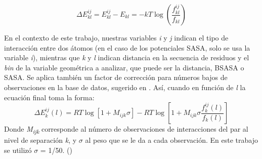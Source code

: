 \begin{equation}
\Delta E^{ij}_{kl} = E^{ij}_{kl} - E_{kl} = -kT\log \left( \frac{f^{ij}_{kl}}{f_{kl}} \right)
\end{equation}
\par
En el contexto de este trabajo, nuestras variables \textit{i} y \textit{j} indican el tipo de interacción entre dos átomos (en el caso de los potenciales SASA, solo se usa la variable \textit{i}), mientras que \textit{k} y \textit{l} indican distancia en la secuencia de residuos y el \textit{bin} de la variable geométrica a analizar, que puede ser la distancia, BSASA o SASA.
Se aplica también un factor de corrección para números bajos de observaciones en la base de datos, sugerido en \cite{Sippl1990}. 
Así, cuando en función de \textit{l} la ecuación final toma la forma:
\begin{equation}
\Delta E^{ij}_{k}(l) = RT\log \left[1 + M_{ijk}\sigma\right] - RT\log \left[ 1 + M_{ijk}\sigma \frac{f^{ij}_{k}(l)}{f_{k}(l)} \right] \label{finalboltz}
\end{equation}
Donde \textit{M\textsubscript{ijk}} corresponde al número de observaciones de interacciones del par al nivel de separación \textit{k}, y $\sigma$ al peso que se le da a cada observación. 
En este trabajo se utilizó $\sigma$ = 1/50. (\cite{Sippl1990,Melo1997})



